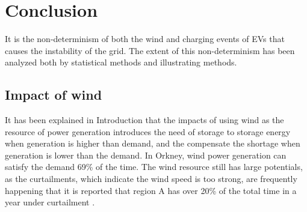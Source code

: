 \documentclass[12pt,a4paper]{report}
\begin{document}


    \chapter{Conclusion}
    It is the non-determinism of both the wind and charging events of EVs that causes the instability of the grid. The extent of this non-determinism has been analyzed both by statistical methods and illustrating methods. 
        \section{Impact of wind}
        It has been explained in Introduction that the impacts of using wind as the resource of power generation introduces the need of storage to storage energy when generation is higher than demand, and the compensate the shortage when generation is lower than the demand. In Orkney, wind power generation can satisfy the demand 69\% of the time. The wind resource still has large potentials, as the curtailments, which indicate the wind speed is too strong, are frequently happening that it is reported that region A has over 20\% of the total time in a year under curtailment \cite{report:OrkneyAudit}.
\end{document}
